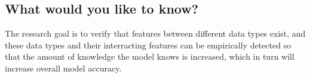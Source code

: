\subsection{What would you like to know?}

The research goal is to verify that features between different data types exist, and these data types and their interracting features can be empirically detected so that the amount of knowledge the model knows is increased, which in turn will increase overall model accuracy.  










